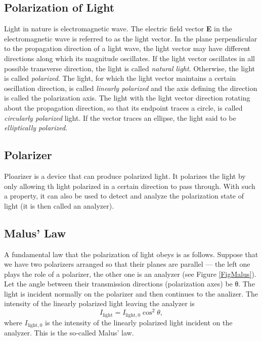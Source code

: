 \documentclass{article}
\begin{document}
\subsection{Polarization of Light}

Light in nature is electromagnetic wave. The electric field vector \textbf{E} in the electromagnetic wave is referred to as the light vector. In the plane perpendicular to the propagation direction of a light wave, the light vector may have different directions along which its magnitude oscillates. If the light vector oscillates in all possible transverse direction, the light is called \textit{natural light}. Otherwise, the light is called \textit{polarized}. The light, for which the light vector maintains a certain oscillation direction, is called \textit{linearly polarized} and the axis defining the direction is called the polarization axis. The light with the light vector direction rotating about the propagation direction, so that its endpoint traces a circle, is called \textit{circularly polarized} light. If the vector traces an ellipse, the light said to be \textit{elliptically polarized}. 

\subsection{Polarizer}

Ploarizer is a device that can produce polarized light. It polarizes the light by only allowing th light polarized in a certain direction to pass through. With such a property, it can also be used to detect and analyze the polarization state of light (it is then called an analyzer).

\subsection{Malus' Law}

A fundamental law that the polarization of light obeys is as follows.
Suppose that we have two polarizers arranged so that their planes are parallel — the left one plays the role of a polarizer, the other one is an analyzer (see Figure \ref{FigMalus}). Let the angle between their transmission directions (polarization axes) be θ. The light is incident normally on the polarizer and then continues to the analizer. The intensity of the linearly polarized light leaving the analyzer is
\begin{equation}\label{eqMalus}
I_{\text{light}} = I_{\text{light},0}\cos^2\theta,
\end{equation}
where $I_{\text{light},0}$ is the intensity of the linearly polarized light incident on the analyzer. This is the so-called Malus' law.
\end{document}
